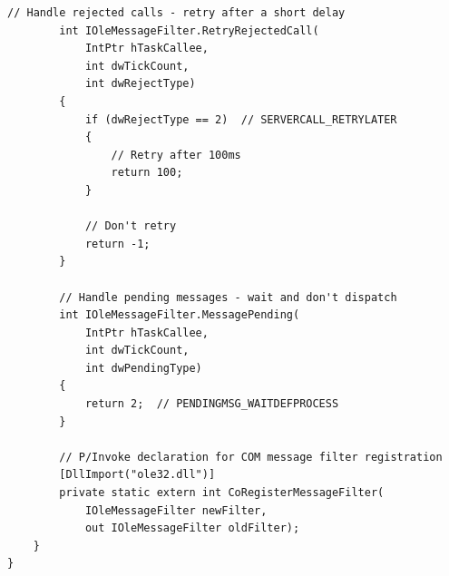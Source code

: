 \documentclass[11pt,a4paper]{article}
\begin{document}
\begin{lstlisting}[style=csharpstyle]
        // Handle rejected calls - retry after a short delay
        int IOleMessageFilter.RetryRejectedCall(
            IntPtr hTaskCallee,
            int dwTickCount,
            int dwRejectType)
        {
            if (dwRejectType == 2)  // SERVERCALL_RETRYLATER
            {
                // Retry after 100ms
                return 100;
            }
            
            // Don't retry
            return -1;
        }

        // Handle pending messages - wait and don't dispatch
        int IOleMessageFilter.MessagePending(
            IntPtr hTaskCallee,
            int dwTickCount,
            int dwPendingType)
        {
            return 2;  // PENDINGMSG_WAITDEFPROCESS
        }

        // P/Invoke declaration for COM message filter registration
        [DllImport("ole32.dll")]
        private static extern int CoRegisterMessageFilter(
            IOleMessageFilter newFilter,
            out IOleMessageFilter oldFilter);
    }
}
\end{lstlisting}
\end{document}
